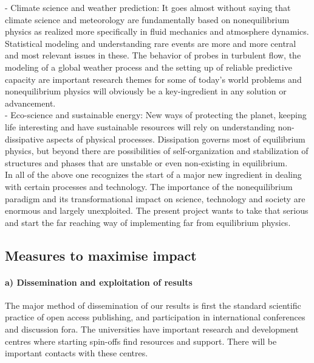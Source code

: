 - Climate science and weather prediction: It goes almost without saying that climate science and meteorology are fundamentally based on nonequilibrium physics as realized more specifically in fluid mechanics and atmosphere dynamics. Statistical modeling and understanding rare events are more and more central and most relevant issues in these. The behavior of probes in turbulent flow, the modeling of a global weather process and the setting up of reliable predictive capacity  are important research themes for some of today's world problems and nonequilibrium physics will obviously be a key-ingredient in any solution or advancement.\\ 
- Eco-science and sustainable energy: New ways of protecting the planet, keeping life interesting and have sustainable resources will rely on understanding non-dissipative aspects of physical processes.  Dissipation governs most of equilibrium physics, but beyond there are possibilities of self-organization and stabilization of structures and phases that are unstable or even non-existing in equilibrium. \\ 

In all of the above one recognizes the start of a major new ingredient in dealing with certain processes and technology.  The importance of the nonequilibrium paradigm and its transformational impact on science, technology and society are enormous and largely unexploited.  The present project wants to take that serious and start the far reaching way of implementing far from equilibrium physics. 

\subsection{Measures to maximise impact}

\paragraph{a) Dissemination and exploitation of results}

The major method of dissemination of our results is first the standard scientific practice of open access publishing, and participation in international conferences and discussion fora.  
The universities have important research and development centres where starting spin-offs find resources and support.
There will be important contacts with these centres. \\


